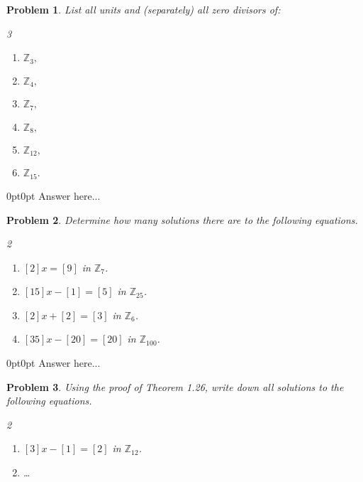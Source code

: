 \documentclass[12pt]{article}
\newtheorem{problem}{Problem}
\numberwithin{problem}{section} %
\theoremstyle{remark}  %
\newenvironment{answer}
    {\begin{adjustwidth}{0pt}{0pt}}
    {\end{adjustwidth}}
\begin{document}
\setcounter{problem}{47}
    \begin{problem}
        List all units and (separately) all zero divisors of:
        \begin{multicols}{3}
            \begin{enumerate}[label=(\alph*)]
                \item $\mathbb{Z}_3,$
                \item $\mathbb{Z}_4,$
                \item $\mathbb{Z}_7,$
                \item $\mathbb{Z}_8,$
                \item $\mathbb{Z}_{12},$
                \item $\mathbb{Z}_{15}.$
            \end{enumerate}
        \end{multicols}
    \end{problem}
    \begin{answer}
        Answer here...
    \end{answer}
\vspace{5pt}
\begin{problem}
    Determine how many solutions there are to the following equations.
    \begin{multicols}{2}
        \begin{enumerate}[label=(\alph*)]
            \item $[2]x = [9]$ in $\mathbb{Z}_{7}$.
            \item $[15]x - [1] = [5]$ in $\mathbb{Z}_{25}$.
            \item $[2]x + [2] = [3]$ in $\mathbb{Z}_{6}$.
            \item $[35]x-[20]=[20]$ in $\mathbb{Z}_{100}$.
        \end{enumerate}
    \end{multicols}
\end{problem}
\begin{answer}
    Answer here...
\end{answer}
\vspace{5pt}
\begin{problem}
    Using the proof of Theorem 1.26, write down all solutions to the following equations.
    \begin{multicols}{2}
        \begin{enumerate}[label=(\alph*)]
            \item $[3]x-[1]=[2]$ in $\mathbb{Z}_{12}$.
            \item \dots
        \end{enumerate}
    \end{multicols}
\end{problem}
\end{document}
